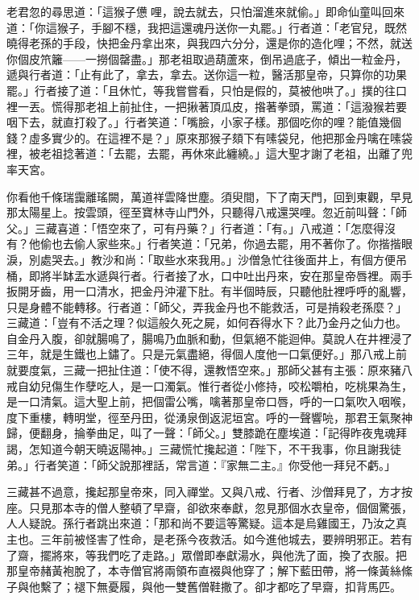 老君忽的尋思道：「這猴子憊𪬯哩，說去就去，只怕溜進來就偷。」即命仙童叫回來道：「你這猴子，手腳不穩，我把這還魂丹送你一丸罷。」行者道：「老官兒，既然曉得老孫的手段，快把金丹拿出來，與我四六分分，還是你的造化哩；不然，就送你個皮笊籬——一撈個罄盡。」那老祖取過葫蘆來，倒吊過底子，傾出一粒金丹，遞與行者道：「止有此了，拿去，拿去。送你這一粒，醫活那皇帝，只算你的功果罷。」行者接了道：「且休忙，等我嘗嘗看，只怕是假的，莫被他哄了。」撲的往口裡一丟。慌得那老祖上前扯住，一把揪著頂瓜皮，揝著拳頭，罵道：「這潑猴若要咽下去，就直打殺了。」行者笑道：「嘴臉，小家子樣。那個吃你的哩？能值幾個錢？虛多實少的。在這裡不是？」原來那猴子頦下有嗉袋兒，他把那金丹噙在嗉袋裡，被老祖捻著道：「去罷，去罷，再休來此纏繞。」這大聖才謝了老祖，出離了兜率天宮。

你看他千條瑞靄離瑤闕，萬道祥雲降世塵。須臾間，下了南天門，回到東觀，早見那太陽星上。按雲頭，徑至寶林寺山門外，只聽得八戒還哭哩。忽近前叫聲：「師父。」三藏喜道：「悟空來了，可有丹藥？」行者道：「有。」八戒道：「怎麼得沒有？他偷也去偷人家些來。」行者笑道：「兄弟，你過去罷，用不著你了。你揩揩眼淚，別處哭去。」教沙和尚：「取些水來我用。」沙僧急忙往後面井上，有個方便吊桶，即將半缽盂水遞與行者。行者接了水，口中吐出丹來，安在那皇帝唇裡。兩手扳開牙齒，用一口清水，把金丹沖灌下肚。有半個時辰，只聽他肚裡呼呼的亂響，只是身體不能轉移。行者道：「師父，弄我金丹也不能救活，可是掯殺老孫麼？」三藏道：「豈有不活之理？似這般久死之屍，如何吞得水下？此乃金丹之仙力也。自金丹入腹，卻就腸鳴了，腸鳴乃血脈和動，但氣絕不能迴伸。莫說人在井裡浸了三年，就是生鐵也上鏽了。只是元氣盡絕，得個人度他一口氣便好。」那八戒上前就要度氣，三藏一把扯住道：「使不得，還教悟空來。」那師父甚有主張：原來豬八戒自幼兒傷生作孽吃人，是一口濁氣。惟行者從小修持，咬松嚼柏，吃桃果為生，是一口清氣。這大聖上前，把個雷公嘴，噙著那皇帝口唇，呼的一口氣吹入咽喉，度下重樓，轉明堂，徑至丹田，從湧泉倒返泥垣宮。呼的一聲響喨，那君王氣聚神歸，便翻身，掄拳曲足，叫了一聲：「師父。」雙膝跪在塵埃道：「記得昨夜鬼魂拜謁，怎知道今朝天曉返陽神。」三藏慌忙攙起道：「陛下，不干我事，你且謝我徒弟。」行者笑道：「師父說那裡話，常言道：『家無二主。』你受他一拜兒不虧。」

三藏甚不過意，攙起那皇帝來，同入禪堂。又與八戒、行者、沙僧拜見了，方才按座。只見那本寺的僧人整頓了早齋，卻欲來奉獻，忽見那個水衣皇帝，個個驚張，人人疑說。孫行者跳出來道：「那和尚不要這等驚疑。這本是烏雞國王，乃汝之真主也。三年前被怪害了性命，是老孫今夜救活。如今進他城去，要辨明邪正。若有了齋，擺將來，等我們吃了走路。」眾僧即奉獻湯水，與他洗了面，換了衣服。把那皇帝赭黃袍脫了，本寺僧官將兩領布直裰與他穿了；解下藍田帶，將一條黃絲絛子與他繫了；褪下無憂履，與他一雙舊僧鞋撒了。卻才都吃了早齋，扣背馬匹。

